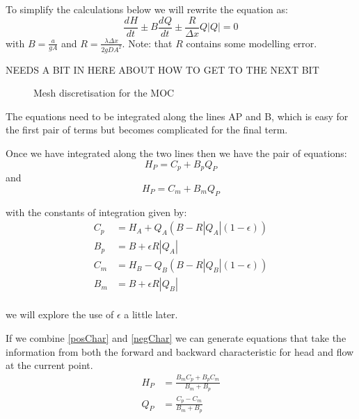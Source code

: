 \documentclass[]{article}
\providecommand{\diff}[3]{\frac{d^{#3} #1}{d #2^{#3}}}
\providecommand{\abs}[1]{\left \lvert#1\right \rvert}
\begin{document}
To simplify the calculations below we will rewrite the equation as:
\begin{equation}
 \diff{H}{t}{} \pm B \diff{Q}{t}{} \pm \frac{R}{\Delta x} Q \abs{Q} = 0
\end{equation}
with $B = \frac{a}{g A}$ and $R = \frac{\lambda \Delta x}{2 g D A^2}$.
Note: that $R$ contains some modelling error.


NEEDS A BIT IN HERE ABOUT HOW TO GET TO THE NEXT BIT

\begin{figure}[htp]
 \centering
 \caption{Mesh discretisation for the MOC}
 \label{MOCmesh}
\end{figure}

The equations need to be integrated along the lines AP and B, which is easy for the first pair of terms but becomes complicated for the final term.

Once we have integrated along the two lines then we have the pair of equations:
\begin{equation}\label{posChar}
 H_P = C_p + B_p Q_P
\end{equation}
and
\begin{equation}\label{negChar}
 H_P = C_m + B_m Q_P
\end{equation}

with the constants of integration given by:
\begin{equation}
 \begin{split}
  C_p &= H_A + Q_A \left(B - R \abs{Q_A} (1-\epsilon)\right) \\
  B_p &= B + \epsilon R \abs{Q_A} \\
  C_m &= H_B - Q_B \left(B - R \abs{Q_B} (1-\epsilon)\right) \\
  B_m &= B + \epsilon R \abs{Q_B} \\ 
 \end{split}
\end{equation}

we will explore the use of $\epsilon$ a little later.

If we combine \eqref{posChar} and \eqref{negChar} we can generate equations that take the information from both the forward and backward characteristic for head and flow at the current point.
\begin{equation}\label{BaseEqn}
 \begin{split}
  H_P &= \frac{B_m C_p + B_p C_m}{B_m + B_p} \\
  Q_P &= \frac{C_p - C_m}{B_m + B_p} \\
 \end{split}
\end{equation}
\end{document}
